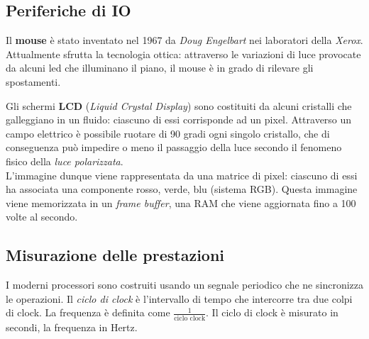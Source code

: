 \subsection{Periferiche di IO}
Il \textbf{mouse} è stato inventato nel 1967 da \textit{Doug Engelbart} nei laboratori della \textit{Xerox}. Attualmente sfrutta la tecnologia ottica: attraverso le variazioni di luce provocate da alcuni led che illuminano il piano, il mouse è in grado di rilevare gli spostamenti.

Gli schermi \textbf{LCD} (\textit{Liquid Crystal Display}) sono costituiti da alcuni cristalli che galleggiano in un fluido: ciascuno di essi corrisponde ad un pixel. Attraverso un campo elettrico è possibile ruotare di 90 gradi ogni singolo cristallo, che di conseguenza può impedire o meno il passaggio della luce secondo il fenomeno fisico della \textit{luce polarizzata}.\\
L'immagine dunque viene rappresentata da una matrice di pixel: ciascuno di essi ha associata una componente rosso, verde, blu (sistema RGB). Questa immagine viene memorizzata in un \textit{frame buffer}, una RAM che viene aggiornata  fino a 100 volte al secondo.

\subsection{Misurazione delle prestazioni}
I moderni processori sono costruiti usando un segnale periodico che ne sincronizza le operazioni. Il \textit{ciclo di clock} è l’intervallo di tempo che intercorre tra due colpi di clock. La frequenza è definita come $\frac{1}{\text{ciclo clock}}$. Il ciclo di clock è misurato in secondi, la frequenza in Hertz.\\

